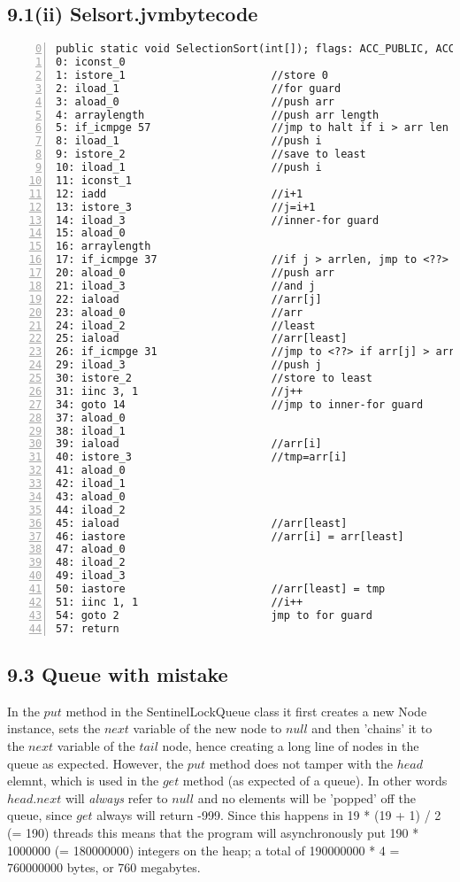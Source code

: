\documentclass[a4paper, titlepage]{article}
\begin{document}
\subsection*{9.1(ii) Selsort.jvmbytecode}
\begin{lstlisting}[numbers=left, firstnumber=0, title=Selsort.jvmbytecode]
  public static void SelectionSort(int[]); flags: ACC_PUBLIC, ACC_STATIC Code: stack=4, locals=4, args_size=1
0: iconst_0
1: istore_1                       //store 0
2: iload_1                        //for guard
3: aload_0                        //push arr
4: arraylength                    //push arr length
5: if_icmpge 57                   //jmp to halt if i > arr len
8: iload_1                        //push i
9: istore_2                       //save to least
10: iload_1                       //push i
11: iconst_1
12: iadd                          //i+1
13: istore_3                      //j=i+1
14: iload_3                       //inner-for guard
15: aload_0
16: arraylength
17: if_icmpge 37                  //if j > arrlen, jmp to <??>
20: aload_0                       //push arr
21: iload_3                       //and j
22: iaload                        //arr[j]
23: aload_0                       //arr
24: iload_2                       //least
25: iaload                        //arr[least]
26: if_icmpge 31                  //jmp to <??> if arr[j] > arr[least]
29: iload_3                       //push j       
30: istore_2                      //store to least
31: iinc 3, 1                     //j++
34: goto 14                       //jmp to inner-for guard
37: aload_0
38: iload_1
39: iaload                        //arr[i]
40: istore_3                      //tmp=arr[i]
41: aload_0
42: iload_1
43: aload_0
44: iload_2
45: iaload                        //arr[least]
46: iastore                       //arr[i] = arr[least]
47: aload_0
48: iload_2
49: iload_3
50: iastore                       //arr[least] = tmp
51: iinc 1, 1                     //i++
54: goto 2                        jmp to for guard
57: return
\end{lstlisting}


\subsection*{9.3 Queue with mistake}
In the $put$ method in the SentinelLockQueue class it first creates a new Node instance, 
sets the $next$ variable of the new node to $null$ and then 'chains' it to the $next$ 
variable of the $tail$ node, hence creating a long line of nodes in the queue as expected. 
However, the $put$ method does not tamper with the $head$ elemnt, which is used in the $get$ 
method (as expected of a queue). In other words $head.next$ will \textit{always} refer to 
$null$ and no elements will be 'popped' off the queue, since $get$ always will return -999. 
Since this happens in 19 * (19 + 1) / 2 (= 190) threads this means that the program will 
asynchronously put 190 * 1000000 (= 180000000) integers on the heap; a total of 
190000000 * 4 = 760000000 bytes, or 760 megabytes.
\end{document}
